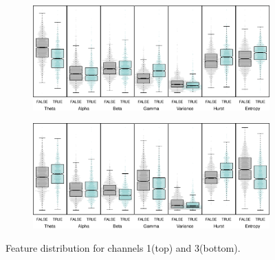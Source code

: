 \begin{figure}[!htbp]
  \begin{subfigure}[b]{ \textwidth}
  \includegraphics[width = \textwidth, keepaspectratio]{./figs/eeg-boxplot1.pdf}
  \end{subfigure} 
  \hfill
  \begin{subfigure}[b]{\textwidth}
  \includegraphics[width = \textwidth, keepaspectratio]{./figs/eeg-boxplotch3.pdf}
      \end{subfigure}
  \caption{Feature distribution for channels 1(top) and 3(bottom).}
  \label{fig:boxplot}
\end{figure}



